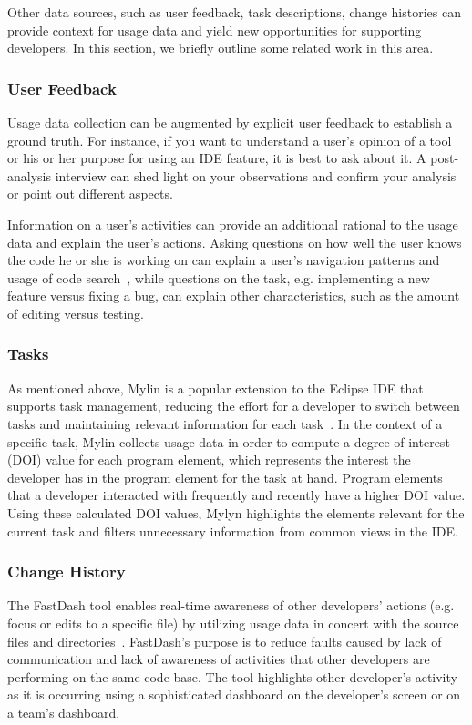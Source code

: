 
Other data sources, such as user feedback, task descriptions, change histories can provide context for usage data and yield new opportunities for supporting developers. In this section, we briefly outline some related work in this area.

\subsubsection{User Feedback}

Usage data collection can be augmented by explicit user feedback to establish a ground truth. For instance, if you want to understand a user's opinion of a tool or his or her purpose for using an IDE feature, it is best to ask about it. A post-analysis interview can shed light on your observations and confirm your analysis or point out different aspects.

Information on a user's activities can provide an additional rational to the usage data and explain the user's actions. Asking questions on how well the user knows the code he or she is working on can explain a user's navigation patterns and usage of code search~\cite{SnipesExperiencesGamifyingSoftwareDevelopment}, while questions on the task, e.g. implementing a new feature versus fixing a bug, can explain other characteristics, such as the amount of editing versus testing.

\subsubsection{Tasks}

As mentioned above, Mylin is a popular extension to the Eclipse IDE that supports task
management, reducing the effort for a developer to switch between
tasks and maintaining relevant information for each
task~\cite{Kersten-Mylin}. In the context of a specific task, Mylin
collects usage data in order to compute a degree-of-interest (DOI)
value for each program element, which represents the interest the
developer has in the program element for the task at hand. Program elements that a developer interacted with frequently and recently have a higher DOI value. Using these calculated DOI values, Mylyn highlights the elements relevant for the current task and filters unnecessary information from common views in the IDE. 

\subsubsection{Change History}

The FastDash tool enables real-time awareness of other developers'
actions (e.g. focus or edits to a specific file) by utilizing usage
data in concert with the source files and
directories~\cite{FastDash}. FastDash's purpose is to reduce faults
caused by lack of communication and lack of awareness of activities
that other developers are performing on the same code base. The tool
highlights other developer's activity as it is occurring using a
sophisticated dashboard on the developer's screen or on a team's dashboard.

